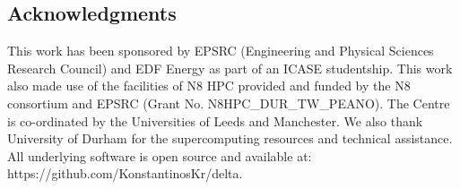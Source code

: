 \documentclass[times,12pt]{article}
\begin{document}
\subsection{Acknowledgments}
This work has been sponsored by EPSRC (Engineering and Physical Sciences Research Council) and EDF Energy as part of an ICASE studentship. This work also made use of the facilities of N8 HPC provided and funded by the N8 consortium and EPSRC (Grant No. N8HPC{\_}DUR{\_}TW{\_}PEANO). The Centre is co-ordinated by the Universities of Leeds and Manchester. We also thank University of Durham for the supercomputing resources and technical assistance. All underlying software is open source and available at: https://github.com/KonstantinosKr/delta.



\clearpage
\nocite{*}
{}

\end{document}
